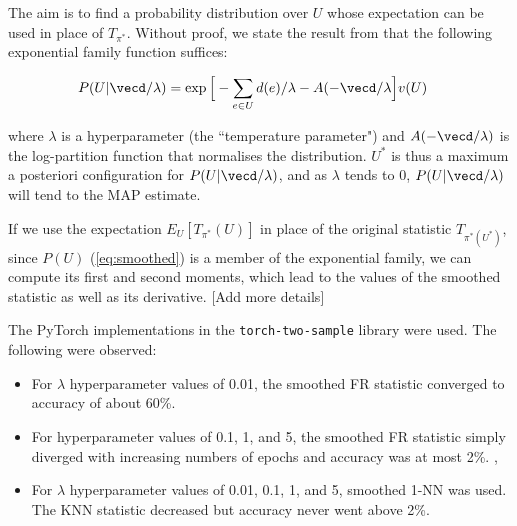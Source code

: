 The aim is to find a probability distribution over $U$ whose expectation can be used in place of $T_{\pi^*}$. Without proof, we state the result from \cite{torchtwosample} that the following exponential family function suffices:

\begin{equation}
\label{eq:smoothed}
\begin{split}
P(U | \vecd / \lambda) &= \exp\Big[-\sum_{e \in U} d(e) / \lambda - A(-\vecd / \lambda \Big] v(U)
\end{split}
\end{equation}

where $\lambda$ is a hyperparameter (the ``temperature parameter") and $A(-\vecd / \lambda)$ is the log-partition function  that normalises the distribution. $U^*$ is thus a maximum a posteriori configuration for $P(U | \vecd/\lambda)$, and as $\lambda$ tends to 0,  $P(U | \vecd/\lambda)$ will tend to the MAP estimate. 

If we use the expectation $E_{U}[T_{\pi^*}(U)]$ in place of the original statistic $T_{\pi^*(U^*)}$, since $P(U)$ (\ref{eq:smoothed}) is a member of the exponential family, we can compute its first and second moments, which lead to the values of the smoothed statistic as well as its derivative.  [Add more details]

The PyTorch implementations in the \texttt{torch-two-sample} library  were used. The following were observed:

\begin{itemize}
    \item For $\lambda$ hyperparameter values of 0.01, the smoothed FR statistic converged to accuracy of about 60\%. 
    \item For hyperparameter values of 0.1, 1, and 5, the smoothed FR statistic simply diverged with increasing numbers of epochs and accuracy was at most 2\%.  , 
    \item For $\lambda$ hyperparameter values of 0.01, 0.1, 1, and 5, smoothed 1-NN was used. The KNN statistic decreased but accuracy never went above 2\%.
\end{itemize}


    
